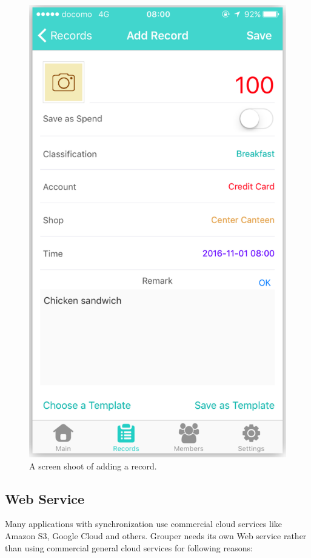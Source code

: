 \documentclass[twocolumn,10pt]{article}
\begin{document}
\begin{figure}[t]
	\centering
	\includegraphics[scale=0.19]{screenshoot}
	\caption{A screen shoot of adding a record.}
\end{figure}

\subsection{Web Service}
Many applications with synchronization use commercial cloud services like Amazon S3, Google Cloud and others. Grouper needs its own Web service rather than using commercial general cloud services for following reasons:
\end{document}
